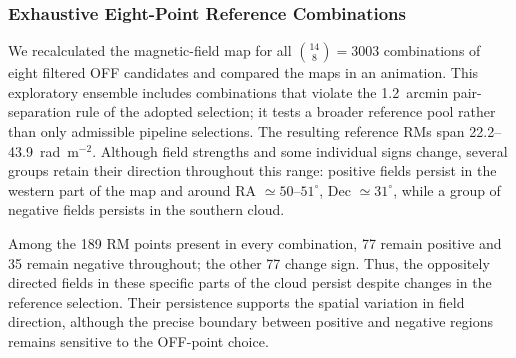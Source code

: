 \documentclass[twocolumn]{aastex701}
\begin{document}




\subsubsection{Exhaustive Eight-Point Reference Combinations}
\label{sec:all-reference-combinations}
\label{sec:rmref-sensitivity}

We recalculated the magnetic-field map for all $\binom{14}{8}=3003$
combinations of eight filtered OFF candidates and compared the maps in an
animation. This exploratory ensemble includes combinations that violate the
1.2~arcmin pair-separation rule of the adopted selection; it tests a broader
reference pool rather than only admissible pipeline selections. The resulting reference RMs span 22.2--43.9~rad~m$^{-2}$.
Although field strengths and some individual signs change, several groups
retain their direction throughout this range: positive fields persist in
the western part of the map and around RA $\simeq50$--$51^\circ$,
Dec $\simeq31^\circ$, while a group of negative fields persists in the
southern cloud.

Among the 189 RM points present in every combination, 77 remain positive
and 35 remain negative throughout; the other 77 change sign. Thus, the
oppositely directed fields in these specific parts of the cloud persist
despite changes in the reference selection. Their persistence supports
the spatial variation in field direction, although the precise boundary
between positive and negative regions remains sensitive to the OFF-point
choice.
\end{document}
